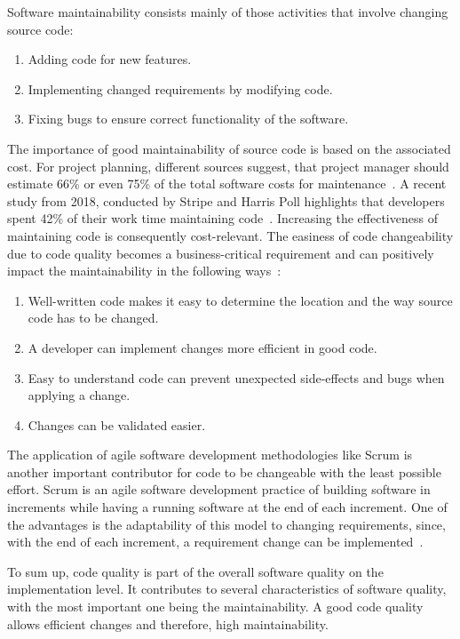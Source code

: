 Software maintainability consists mainly of those activities that involve changing source code:
\begin{enumerate}
    \item Adding code for new features.
    \item Implementing changed requirements by modifying code.
    \item Fixing bugs to ensure correct functionality of the software.
\end{enumerate}
The importance of good maintainability of source code is based on the associated cost. 
For project planning, different sources suggest, that project manager should estimate 66\% or even 75\% of the total software costs for maintenance~\cite{yip_software_1994, galorath_accurately_2019}. A recent study from 2018, conducted by Stripe and Harris Poll highlights that developers spent 42\% of their work time maintaining code~\cite{stripe_developer_2018}. Increasing the effectiveness of maintaining code is consequently cost-relevant. The easiness of code changeability due to code quality becomes a business-critical requirement and can positively impact the maintainability in the following ways~\cite{baggen_standardized_2012}:
\begin{enumerate}
    \item Well-written code makes it easy to determine the location and the way source code has to be changed.
    \item A developer can implement changes more efficient in good code.
    \item Easy to understand code can prevent unexpected side-effects and bugs when applying a change.
    \item Changes can be validated easier. 
\end{enumerate}

The application of agile software development methodologies like Scrum is another important contributor for code to be changeable with the least possible effort. Scrum is an agile software development practice of building software in increments while having a running software at the end of each increment. One of the advantages is the adaptability of this model to changing requirements, since, with the end of each increment, a requirement change can be implemented~\cite{schwaber_agile_2002}. 

To sum up, code quality is part of the overall software quality on the implementation level. It contributes to several characteristics of software quality, with the most important one being the maintainability. A good code quality allows efficient changes and therefore, high maintainability.

